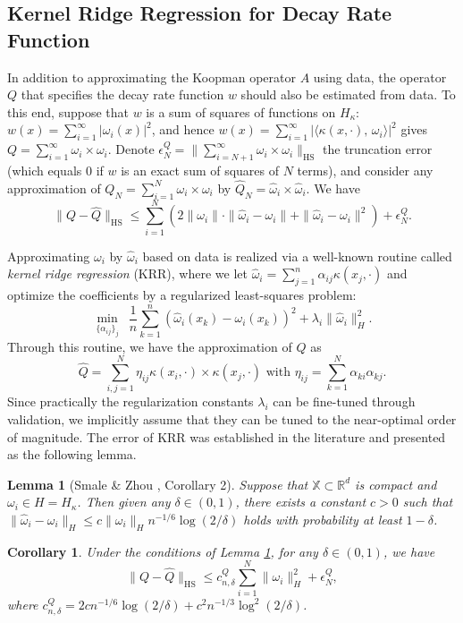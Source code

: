 \documentclass[english]{cccconf}
\renewcommand{\emph}[1]{\textit{#1}}
\newtheorem{lemma}{Lemma}
\newtheorem{corollary}{Corollary}
\newcommand{\mr}[1]{\mathrm{#1}}
\newcommand{\mbb}[1]{\mathds{#1}} %
\newcommand{\mR}{\mbb{R}}
\newcommand{\mX}{\mbb{X}}
\newcommand{\bra}[1]{\left( #1 \right)}
\newcommand{\ip}[2]{\langle #1, \, #2 \rangle}
\begin{document}
\subsection{Kernel Ridge Regression for Decay Rate Function}
\par In addition to approximating the Koopman operator $A$ using data, the operator $Q$ that specifies the decay rate function $w$ should also be estimated from data. To this end, suppose that $w$ is a sum of squares of functions on $H_\kappa$: $w(x) = \sum_{i=1}^\infty |\omega_i(x)|^2$, and hence $w(x) = \sum_{i=1}^\infty |\ip{\kappa(x, \cdot)}{\omega_i}|^2$ gives $Q = \sum_{i=1}^\infty \omega_i\times \omega_i$. 
Denote $\epsilon^Q_N = \|\sum_{i=N+1}^\infty \omega_i\times \omega_i\|_{\mr{HS}}$ the truncation error (which equals $0$ if $w$ is an exact sum of squares of $N$ terms), and consider any approximation of $Q_N = \sum_{i=1}^N \omega_i\times \omega_i$ by $\hat{Q}_N = \hat{\omega}_i\times \hat{\omega}_i$. We have  
$$\textstyle 
\|Q-\hat{Q}\|_{\mr{HS}} \leq \sum_{i=1}^N \bra{2\|\omega_i\|\cdot\|\hat{\omega}_i-\omega_i\| + \|\hat{\omega}_i-\omega_i\|^2} + \epsilon^Q_N.$$

\par Approximating $\omega_i$ by $\hat{\omega}_i$ based on data is realized via a well-known routine called \emph{kernel ridge regression} (KRR), where we let $\hat{\omega}_i = \sum_{j=1}^n \alpha_{ij}\kappa(x_j, \cdot)$ and optimize the coefficients by a regularized least-squares problem:
\begin{equation}\label{eq:KRR}
    \textstyle 
    \min_{\{\alpha_{ij}\}_j} \enspace \frac{1}{n}\sum_{k=1}^n \bra{\hat{\omega}_i(x_k) - \omega_i(x_k)}^2 + \lambda_i \|\hat{\omega}_i\|_H^2.  
\end{equation}
Through this routine, we have the approximation of $Q$ as 
\begin{equation}\label{eq:Q.approximation}
    \textstyle \hat{Q} = \sum_{i,j=1}^N \eta_{ij}\kappa(x_i, \cdot)\times \kappa(x_j, \cdot) \text{ with } \eta_{ij} = \sum_{k=1}^N \alpha_{ki}\alpha_{kj}. 
\end{equation}
Since practically the regularization constants $\lambda_i$ can be fine-tuned through validation, we implicitly assume that they can be tuned to the near-optimal order of magnitude. 
The error of KRR was established in the literature and presented as the following lemma. 
\begin{lemma}[Smale \& Zhou \cite{smale2007learning}, Corollary 2]
\label{lem:KRR}
    Suppose that $\mX\subset \mR^d$ is compact and $\omega_i\in H=H_\kappa$. Then given any $\delta\in (0, 1)$, there exists a constant $c>0$ such that $\|\hat{\omega}_i-\omega_i\|_H\leq c \|\omega_i\|_H n^{-1/6} \log(2/\delta)$ holds with probability at least $1-\delta$. 
\end{lemma}
\begin{corollary}
    Under the conditions of Lemma \ref{lem:KRR}, for any $\delta\in (0,1)$, we have
    $$\textstyle 
    \|Q-\hat{Q}\|_{\mr{HS}} \leq c^Q_{n,\delta} \sum_{i=1}^N \|\omega_i\|_{H}^2 + \epsilon^Q_N ,$$
    where $c^Q_{n,\delta} = 2cn^{-1/6}\log(2/\delta) + c^2n^{-1/3}\log^2(2/\delta)$.  
\end{corollary}
\end{document}
